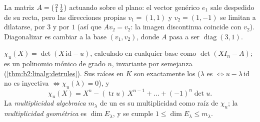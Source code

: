 \begin{omfigure}

{\small La matriz $A = \begin{psmallmatrix}2 & 1\\ 1 &
2\end{psmallmatrix}$ actuando sobre el plano: el vector genérico
$e_1$ sale despedido de su recta, pero las direcciones propias $v_1 =
(1,1)$ y $v_2 = (1,-1)$ se limitan a dilatarse, por $3$ y por $1$
(así que $Av_2 = v_2$: la imagen discontinua coincide con $v_2$).
Diagonalizar es cambiar a la base $(v_1, v_2)$, donde $A$ pasa a ser
$\operatorname{diag}(3, 1)$.}
\end{omfigure}

\begin{definition}\label{def:b2:reduction:charpoly}
$\chi_u(X) = \det(X\,\mathrm{id} - u)$, calculado en cualquier base como $\det(XI_n - A)$;
es un polinomio mónico de grado $n$, invariante por semejanza
(\cref{thm:b2:linalg:detrules}). Sus raíces en $K$ son exactamente
los  ($\lambda$ es  $\iff u -
\lambda\,\mathrm{id}$ no es inyectiva $\iff \chi_u(\lambda) = 0$), y
\[
\chi_u(X) = X^n - (\operatorname{tr} u)\, X^{n-1} + \dots +
(-1)^n \det u .
\]
La \emph{multiplicidad algebraica}
$m_\lambda$ de un  es su multiplicidad como raíz de
$\chi_u$; la \emph{multiplicidad geométrica} es $\dim E_\lambda$, y se cumple $1 \leq \dim E_\lambda
\leq m_\lambda$.
\end{definition}

